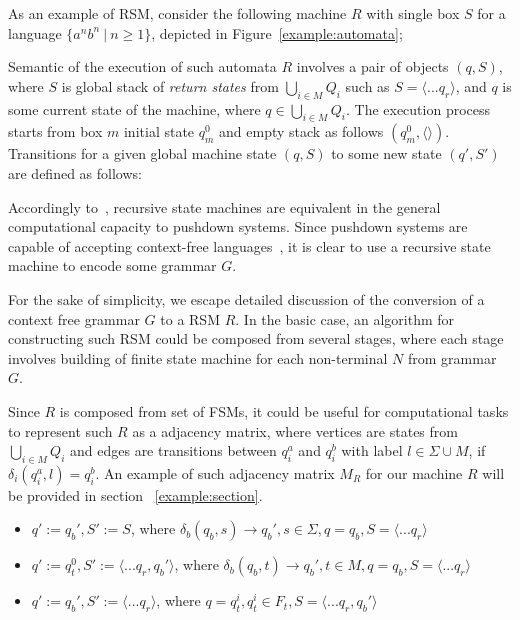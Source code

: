 As an example of RSM, consider the following machine $R$ with single box $S$ for a language $\{a^n b^n~|~n \geq 1\}$, depicted in Figure~\ref{example:automata};

Semantic of the execution of such automata $R$ involves a pair of objects $(q,S)$, where $S$ is global stack of \textit{return states} from $\bigcup_{i \in M}Q_i$ such as $S=\langle ...q_r \rangle$, and $q$ is some current state of the machine, where $q \in \bigcup_{i \in M}Q_i$. The execution process starts from box $m$ initial state $q_m^0$ and empty stack as follows $(q_m^0,\langle \rangle)$. Transitions for a given global machine state $(q,S)$ to some new state $(q',S')$ are defined as follows:

Accordingly to~\cite{rsm:analysis:10.1007/3-540-44585-4_18}, recursive state machines are equivalent in the general computational capacity to pushdown systems. Since pushdown systems are capable of accepting context-free languages~\cite{automata:theory:10.5555/1177300}, it is clear to use a recursive state machine to encode some grammar $G$. 

For the sake of simplicity, we escape detailed discussion of the conversion of a context free grammar $G$ to a RSM $R$. In the basic case, an algorithm for constructing such RSM could be composed from several stages, where each stage involves building of finite state machine for each non-terminal $N$ from grammar $G$.

Since $R$ is composed from set of FSMs, it could be useful for computational tasks to represent such $R$ as a adjacency matrix, where vertices are states from $\bigcup_{i \in M}Q_i$ and edges are transitions between $q_i^a$ and $q_i^b$ with label $l \in \Sigma \cup M$, if $\delta_i (q_i^a, l) = q_i^b$. An example of such adjacency matrix $M_R$ for our machine $R$ will be provided in section~ \ref{example:section}.

\begin{itemize}
    \item $q':=q_b', S':=S$, 
    where $\delta_b (q_b,s) \to q_b', s \in \Sigma, 
    q=q_b, S = \langle ...q_r \rangle$
    \item $q':=q_t^0, S':=\langle ...q_r,q_b'\rangle$, 
    where $\delta_b (q_b,t) \to q_b', t \in M, q=q_b, S = \langle ...q_r \rangle$
    \item $q':=q_b', S':=\langle ...q_r \rangle$, 
    where $q=q_t^i, q_t^i \in F_t, S=\langle ...q_r,q_b' \rangle$
\end{itemize}

